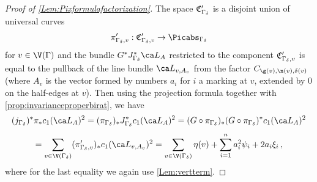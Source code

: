 \begin{proof}[Proof of \cref{Lem:Pixformulafactorization}]
The space $\frak C'_{\Gamma_{\delta}}$ is a disjoint union of universal curves
$$\pi'_{\Gamma_\delta,v} : \frak C'_{\Gamma_{\delta},v} \to \Picabs_{\Gamma_\delta}$$
for $v \in \V(\Gamma)$ and the bundle  $G^* J_{\Gamma_\delta}^* \ca L_A$ restricted to the component $\frak C'_{\Gamma_{\delta},v}$ is equal to the pullback of the line bundle $\ca L_{v, A_v}$ from the factor $C_{\g(v),\n(v),\delta(v)}$ (where $A_v$ is the vector formed by numbers $a_i$ for $i$ a marking at $v$, extended by $0$ on the half-edges at $v$). Then using the projection formula together with \cref{prop:invarianceproperbirat}, we have
    $$(j_{\Gamma_\delta})^* \pi_* c_1(\ca L_A)^2 = (\pi_{\Gamma_\delta})_* J_{\Gamma_\delta}^* c_1(\ca L_A)^2 = (G \circ \pi_{\Gamma_\delta})_* (G \circ \pi_{\Gamma_\delta})^*c_1(\ca L_A)^2$$
    $$= \sum_{v \in \V(\Gamma_\delta)}(\pi'_{\Gamma_\delta,v})_* c_1(\ca L_{v, A_v})^2 = \sum_{v \in \V(\Gamma_\delta)} \eta(v) + \sum_{i=1}^n  a_i^2 \psi_i + 2 a_i \xi_i\, ,$$
where for the last equality we again use \cref{Lem:vertterm}.
\end{proof}
